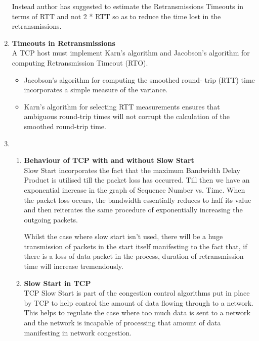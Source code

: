 \documentclass[12pt]{article}
\begin{document}
\begin{enumerate}
    Instead author has suggested to estimate the Retransmissions Timeouts in terms of RTT and not 2 * RTT so as to reduce the time lost in the retransmissions.

    \item \textbf{Timeouts in Retransmissions} \\
    A TCP host must implement Karn's algorithm and Jacobson's algorithm for computing Retransmission Timeout (RTO).
    
    \begin{itemize}
        \item Jacobson's algorithm for computing the smoothed round- trip (RTT) time incorporates a simple measure of the variance.
        \item Karn's algorithm for selecting RTT measurements ensures that ambiguous round-trip times will not corrupt the calculation of the smoothed round-trip time.
    \end{itemize}
    
    \item 
    \begin{enumerate}[label=(\alph*)] %
        \item \textbf{Behaviour of TCP with and without Slow Start} \\
        Slow Start incorporates the fact that the maximum Bandwidth Delay Product is utilised till the packet loss has occurred. Till then we have an exponential increase in the graph of Sequence Number vs. Time. When the packet loss occurs, the bandwidth essentially reduces to half its value and then reiterates the same procedure of exponentially increasing the outgoing packets.
        
        Whilst the case where slow start isn't used, there will be a huge transmission of packets in the start itself manifesting to the fact that, if there is a loss of data packet in the process, duration of retransmission time will increase tremendously.
    
    \item \textbf{Slow Start in TCP} \\
    TCP Slow Start is part of the congestion control algorithms put in place by TCP to help control the amount of data flowing through to a network. This helps to regulate the case where too much data is sent to a network and the network is incapable of processing that amount of data manifesting in network congestion.
    \end{enumerate} %
    

\end{enumerate}
\end{document}
